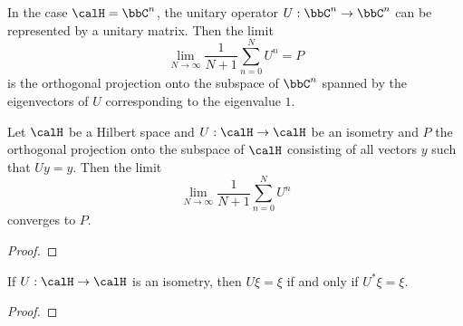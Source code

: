     In the case \(\calH = \bbC^n\), the unitary operator \(U: \bbC^n \to \bbC^n\) can be represented by a unitary matrix.
    Then the limit
    \[ \lim_{N \to \infty} \frac{1}{N+1} \sum_{n=0}^{N} U^n = P\]
    is the orthogonal projection onto the subspace of \(\bbC^n\) spanned by the eigenvectors of \(U\) corresponding to the eigenvalue \(1\).

    \begin{theorem}\label{thm:von_neumann_mean_ergodic_theorem}
        Let \(\calH\) be a Hilbert space and \(U: \calH \to \calH\) be an isometry and \(P\) the orthogonal projection onto the subspace of \(\calH\) consisting of all vectors \(y\) such that \(U y = y\).
        Then the limit
        \[ \lim_{N \to \infty} \frac{1}{N+1} \sum_{n=0}^{N} U^n\]
        converges to \(P\).
    \end{theorem}
    \begin{proof}
    \end{proof}

    \begin{lemma}\label{lem:U_xi_equals_xi_iff_U_star_xi_equals_xi}
        If \(U: \calH \to \calH\) is an isometry, then \(U \xi = \xi\) if and only if \(U^* \xi = \xi\).
    \end{lemma}
    \begin{proof}
    \end{proof}